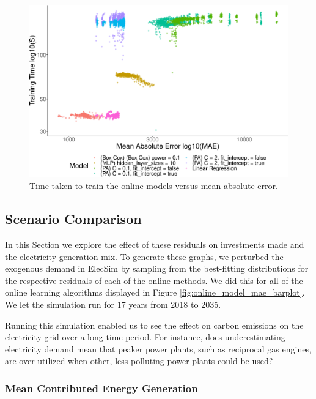 \begin{figure}[h]
\centering
\includegraphics[width=\columnwidth]{Chapter5/figures/market-forecasting/results/online_training_time_vs_mae_all_results_opaque.eps}
\caption{Time taken to train the online models versus mean absolute error.}
\label{fig:online_train_vs_mae}
\end{figure}








\subsection{Scenario Comparison}

In this Section we explore the effect of these residuals on investments made and the electricity generation mix.  To generate these graphs, we perturbed the exogenous demand in ElecSim by sampling from the best-fitting distributions for the respective residuals of each of the online methods. We did this for all of the online learning algorithms displayed in Figure \ref{fig:online_model_mae_barplot}. We let the simulation run for 17 years from 2018 to 2035. 

Running this simulation enabled us to see the effect on carbon emissions on the electricity grid over a long time period. For instance, does underestimating electricity demand mean that peaker power plants, such as reciprocal gas engines, are over utilized when other, less polluting power plants could be used?



\subsubsection{Mean Contributed Energy Generation}


